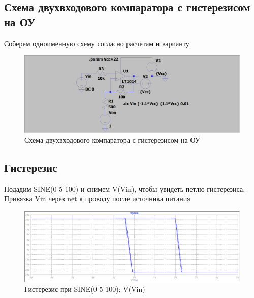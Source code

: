 \documentclass[a4paper, 12pt]{article}
\begin{document}
    \subsection{Схема двухвходового компаратора с гистерезисом на ОУ}
    Соберем одноименную схему согласно расчетам и варианту
    \begin{figure}[H]
        \centering
        \includegraphics[scale=0.22]{scheme8.png}
        \captionsetup{skip=0pt}
        \caption{Схема двухвходового компаратора с гистерезисом на ОУ}
        \label{fig:scheme8}
    \end{figure}


    \subsection{Гистерезис}
    Подадим SINE(0 5 100) и снимем V(Vin), чтобы увидеть петлю гистерезиса. Привязка Vin через net к проводу после источника питания
    \begin{figure}[H]
        \centering
        \includegraphics[scale=0.46]{hystesis1.png}
        \captionsetup{skip=0pt}
        \caption{Гистерезис при SINE(0 5 100): V(Vin)}
        \label{fig:hystesis1}
    \end{figure}
\end{document}
